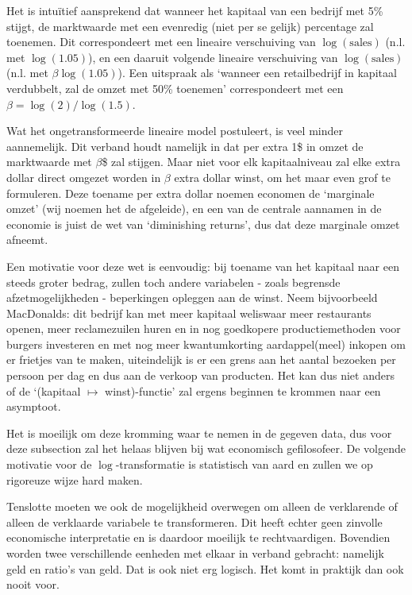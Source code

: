 \documentclass[a4paper]{report}
\begin{document}
  Het is intu\"itief aansprekend dat wanneer het kapitaal van een bedrijf met 5\% stijgt, de marktwaarde met een evenredig (niet per se gelijk) percentage zal toenemen. Dit correspondeert met een lineaire verschuiving van $\log(\text{sales})$ (n.l. met $\log(1.05)$), en een daaruit volgende lineaire verschuiving van $\log(\text{sales})$ (n.l. met $\beta \log(1.05)$). Een uitspraak als `wanneer een retailbedrijf in kapitaal verdubbelt, zal de omzet met 50\% toenemen' correspondeert met een $\beta = \log(2)/\log(1.5)$.
  
  Wat het ongetransformeerde lineaire model postuleert, is veel minder aannemelijk. Dit verband houdt namelijk in dat per extra 1\$ in omzet de marktwaarde met $\beta$\$ zal stijgen. Maar niet voor elk kapitaalniveau zal elke extra dollar direct omgezet worden in $\beta$ extra dollar winst, om het maar even grof te formuleren. Deze toename per extra dollar noemen economen de `marginale omzet' (wij noemen het de afgeleide), en een van de centrale aannamen in de economie is juist de wet van `diminishing returns', dus dat deze marginale omzet afneemt. 
  
  Een motivatie voor deze wet is eenvoudig: bij toename van het kapitaal naar een steeds groter bedrag, zullen toch andere variabelen - zoals begrensde afzetmogelijkheden - beperkingen opleggen aan de winst. Neem bijvoorbeeld MacDonalds: dit bedrijf kan met meer kapitaal weliswaar meer restaurants openen, meer reclamezuilen huren en in nog goedkopere productiemethoden voor burgers investeren en met nog meer kwantumkorting aardappel(meel) inkopen om er frietjes van te maken, uiteindelijk is er een grens aan het aantal bezoeken per persoon per dag en dus aan de verkoop van producten. Het kan dus niet anders of de `(kapitaal $\mapsto$ winst)-functie' zal ergens beginnen te krommen naar een asymptoot.
  
  
  Het is moeilijk om deze kromming waar te nemen in de gegeven data, dus voor deze subsection zal het helaas blijven bij wat economisch gefilosofeer. De volgende motivatie voor de $\log$-transformatie is statistisch van aard en zullen we op rigoreuze wijze hard maken.
  
  Tenslotte moeten we ook de mogelijkheid overwegen om alleen de verklarende of alleen de verklaarde variabele te transformeren. Dit heeft echter geen zinvolle economische interpretatie en is daardoor moeilijk te rechtvaardigen. Bovendien worden twee verschillende eenheden met elkaar in verband gebracht: namelijk geld en ratio's van geld. Dat is ook niet erg logisch. Het komt in praktijk dan ook nooit voor.
 
\end{document}
